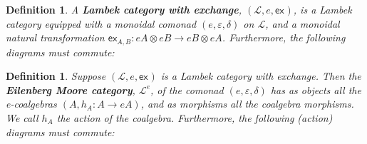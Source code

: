 \documentclass{article}
\newtheorem{definition}[theorem]{Definition}
\let\mto\to
\let\to\relax
\newcommand{\to}{\rightarrow}
\newcommand{\cat}[1]{\mathcal{#1}}
\newcommand{\e}[1]{\mathsf{ex}_{#1}}
\newcommand{\q}[1]{\mathsf{q}_{#1}}
\begin{document}
\begin{definition}
  \label{def:exchange}
  A \textbf{Lambek category with exchange}, $(\cat{L},e,\e{})$, is a
  Lambek category equipped with a monoidal comonad
  $(e,\varepsilon,\delta)$ on $\cat{L}$, and a monoidal natural
  transformation $\e{A,B}:eA \otimes eB \mto eB \otimes eA$.
  Furthermore, the following diagrams must commute:
\end{definition}


\begin{definition}
  \label{def:eilenberg-moore-cat}
  Suppose $(\cat{L},e,\e{})$ is a Lambek category with exchange.  Then
  the \textbf{Eilenberg Moore category}, $\cat{L}^e$, of the comonad
  $(e, \varepsilon, \delta)$ has as objects all the e-coalgebras $(A,
  h_A : A \mto eA)$, and as morphisms all the coalgebra morphisms.  We
  call $h_A$ the action of the coalgebra.  Furthermore, the following
  (action) diagrams must commute:
\end{definition}
\end{document}
